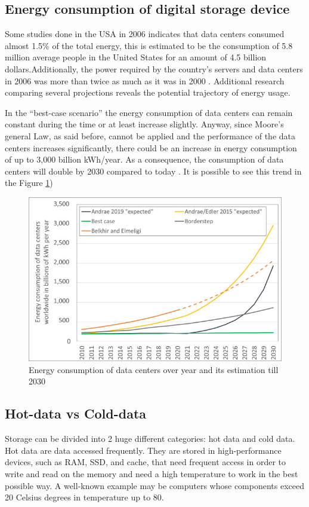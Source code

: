 \documentclass[10pt,twocolumn,twoside]{gsajnl}
\theoremstyle{definition}
\begin{document}
\subsection{Energy consumption of digital storage device}    Some studies done in the USA in 2006 indicates that data centers consumed almost 1.5\% of the total energy, this is estimated to be the consumption of 5.8 million average people in the United States for an amount of 4.5 billion dollars.Additionally, the power required by the country's servers and data centers in 2006 was more than twice as much as it was in 2000 \cite{shehabi2016united}. Additional research comparing several projections reveals the potential trajectory of energy usage.

In the “best-case scenario” the energy consumption of data centers can remain constant during the time or at least increase slightly. Anyway, since Moore's general Law, as said before, cannot be applied and the performance of the data centers increases significantly, there could be an increase in energy consumption of up to 3,000 billion kWh/year. As a consequence, the consumption of data centers will double by 2030 compared to today \cite{hintemann2019energy}.
It is possible to see this trend in the Figure \ref{fig2})

\begin{figure}[ht]
    \includegraphics[width=\linewidth]{Figures/Energy-consumption-of-servers-and-data-centers-worldwide-forecasts-to-2030-A-comparison.jpg}
    \centering
    \caption{Energy consumption of data centers over year and its estimation till 2030 \cite{inproceedings}}
    \label{fig2}
\end{figure}

\subsection{Hot-data vs Cold-data}
Storage can be divided into 2 huge different categories: hot data and cold data.
Hot data are data accessed frequently. They are stored in high-performance devices, such as RAM, SSD, and cache, that need frequent access in order to write and read on the memory and need a high temperature to work in the best possible way. A well-known example may be computers whose components exceed 20 Celsius degrees in temperature up to 80.
\end{document}
